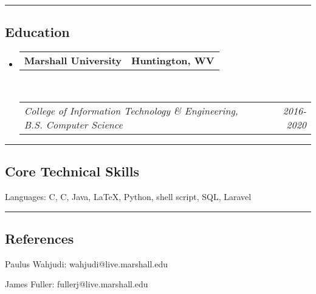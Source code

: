 \documentclass[10pt,letterpaper]{article}
\makeatletter
\newenvironment{indentsection}[1]%
{\begin{list}{}%
	{\setlength{\leftmargin}{#1}}%
	\item[]%
}
{\end{list}}
\newcommand{\headerrow}[2]
{\begin{tabular*}{\linewidth}{l@{\extracolsep{\fill}}r}
	#1 &
	#2 \\
\end{tabular*}}
\newcommand{\CPP}
{C\nolinebreak[4]\hspace{-.05em}\raisebox{.22ex}{\footnotesize\bf ++}}
\makeatother
\begin{document}
\hrule
\vspace{-0.4em}
\subsection*{Education}

\begin{itemize}
	\parskip=0.1em

	\item 
	\headerrow
		{\textbf{Marshall University}}
		{\textbf{Huntington, WV}}
	\\
	\headerrow
		{\emph{College of Information Technology \& Engineering, B.S. Computer Science}}
		{\emph{2016-2020}}

\end{itemize}


\hrule
\vspace{-0.4em}
\subsection*{Core Technical Skills}

\begin{indentsection}{\parindent}
\begin{description*}
	\item[Languages:]
	C, \CPP, Java, \LaTeX, Python, shell script, SQL, Laravel
\end{description*}
\end{indentsection}

\hrule
\vspace{-0.4em}
\subsection*{References}

\begin{indentsection}{\parindent}
\begin{description*}
	\item[Paulus Wahjudi:]
	wahjudi@live.marshall.edu
	\item[James Fuller:]
	fullerj@live.marshall.edu
\end{description*}
\end{indentsection}
\end{document}
